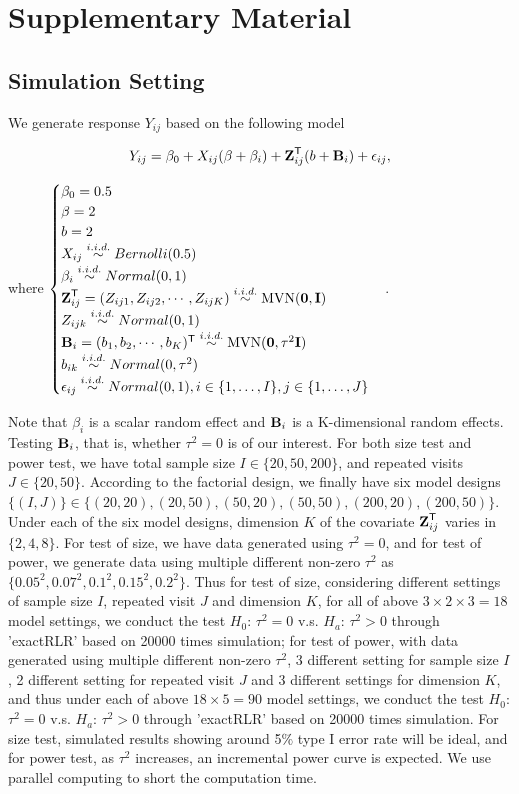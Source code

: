 \section*{Supplementary Material}
\subsection{Simulation Setting}
We generate response $Y_{ij}$ based on the following model

$$
Y_{ij} = \beta_0 + X_{ij} (\beta + \beta_i) + \V{Z}_{ij}\Tra ({b} + \V{b}_i) + \epsilon_{ij}, 
$$

where $\begin{cases} \beta_0 = 0.5 \\ \beta = 2 \\ b = 2 \\ X_{ij} \overset{i.i.d.}{\sim} Bernolli(0.5) \\ \beta_i \overset{i.i.d.}{\sim} Normal(0, 1) \\ \V{Z}_{ij}\Tra = (Z_{ij1}, Z_{ij2}, \cdots, Z_{ijK}) \overset{i.i.d.}{\sim} \mbox{MVN}(\V{0}, \M{I}) \\ Z_{ijk} \overset{i.i.d.}{\sim} Normal(0, 1) \\ \V{b}_i = (b_{1}, b_{2}, \cdots, b_{K})\Tra \overset{i.i.d.}{\sim} \mbox{MVN}(\V{0}, \tau^2\M{I})\\ b_{ik} \overset{i.i.d.}{\sim} Normal(0, \tau^2) \\ \epsilon_{ij} \overset{i.i.d.}{\sim} Normal(0, 1), i\in \{1,\dots,I\}, j\in  \{1,\dots,J\}\\ \end{cases}$.

 Note that $\beta_i$ is a scalar random effect and $\V{b}_i$ is a K-dimensional random effects. Testing $\V{b}_i$, that is, whether $\tau^2=0$ is of our interest. For both size test and power test, we have total sample size $I \in \{20,50,200\}$, and repeated visits $J \in \{20, 50\}$. According to the factorial design, we finally have six model designs $\{(I,J)\}\in \{(20,20),(20,50),(50,20),(50,50),(200,20),(200,50)\}$. Under each of the six model designs, dimension $K$ of the covariate $\V{Z}_{ij}\Tra$ varies in $\{2,4,8\}$. For test of size, we have data generated using $\tau^2=0$, and for test of power, we generate data using multiple different non-zero $\tau^2$ as $\{0.05^2, 0.07^2, 0.1^2, 0.15^2, 0.2^2\}$. Thus for test of size, considering different settings of sample size $I$, repeated visit $J$ and dimension $K$, for all of above $3\times 2\times 3=18$ model settings, we conduct the test $H_0$: $\tau^2= 0$ v.s. $H_a$: $\tau^2 > 0$ through 'exactRLR' based on 20000 times simulation; for test of power, with data generated using multiple different non-zero $\tau^2$, 3 different setting for sample size $I$, 2 different setting for repeated visit $J$ and 3 different settings for dimension $K$, and thus under each of above $18\times 5=90$ model settings, we conduct the test $H_0$: $\tau^2= 0$ v.s. $H_a$: $\tau^2 > 0$ through 'exactRLR' based on 20000 times simulation. For size test, simulated results showing around 5$\%$ type I error rate will be ideal, and for power test, as $\tau^2$ increases, an incremental power curve is expected. We use parallel computing to short the computation time.


